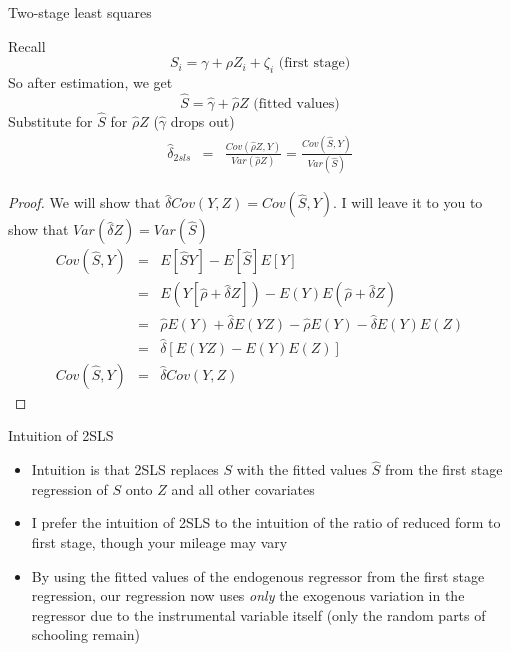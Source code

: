 \documentclass{beamer}
\begin{document}
\begin{frame}{Two-stage least squares}
	
Recall $$ S_i = \gamma + \rho{Z}_i + \zeta_i \text{ (first stage)} $$So after estimation, we get $$\widehat{S}=\widehat{\gamma} + \widehat{\rho}Z \text{ (fitted values)}$$  
Substitute for $\widehat{S}$ for $\widehat{\rho}Z$ ($\widehat{\gamma}$ drops out)
		\begin{eqnarray*}
		\widehat{\delta}_{2sls} &=& \frac{Cov(\widehat{\rho}Z,Y)}{Var(\widehat{\rho}Z)} =  \frac{Cov(\widehat{S},Y)}{Var(\widehat{S})}
		\end{eqnarray*}
		
		

\end{frame}

\begin{frame}[plain]

		\begin{proof}
		We will show that $\widehat{\delta}Cov(Y,Z) = Cov(\widehat{S},Y)$.  I will leave it to you to show that $Var(\widehat{\delta}Z) = Var(\widehat{S})$
		\begin{eqnarray*}
		Cov(\widehat{S},Y) &=& E[\widehat{S}Y] - E[\widehat{S}]E[Y] \\
		&=& E(Y[\widehat{\rho} + \widehat{\delta}Z]) - E(Y)E(\widehat{\rho} + \widehat{\delta}Z) \\
		&=& \widehat{\rho}E(Y) + \widehat{\delta}E(YZ) - \widehat{\rho}E(Y) - \widehat{\delta}E(Y)E(Z) \\
		&=&\widehat{\delta}[E(YZ) - E(Y)E(Z)] \\
		Cov(\widehat{S},Y) &=& \widehat{\delta}Cov(Y,Z)
		\end{eqnarray*}
		\qedhere
		\end{proof}

\end{frame}


\begin{frame}{Intuition of 2SLS}
	
	\begin{itemize}
	\item Intuition is that 2SLS replaces $S$ with the fitted values $\widehat{S}$ from the first stage regression of $S$ onto $Z$ and all other covariates 
	\item I prefer the intuition of 2SLS to the intuition of the ratio of reduced form to first stage, though your mileage may vary
	\item By using the fitted values of the endogenous regressor from the first stage regression, our regression now uses \emph{only} the exogenous variation in the regressor due to the instrumental variable itself (only the random parts of schooling remain)
	\end{itemize}
\end{frame}
\end{document}
